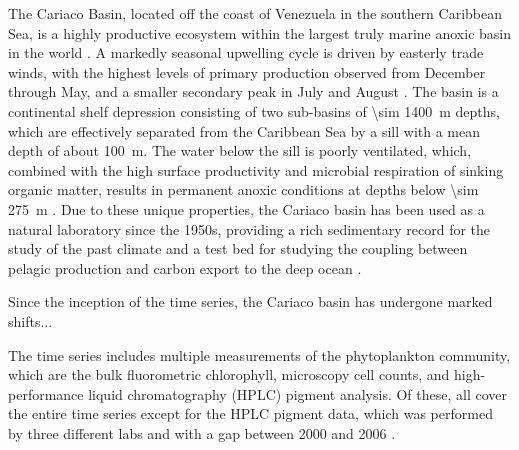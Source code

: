 \documentclass[draft]{agujournal2019}
\begin{document}
    The Cariaco Basin, located off the coast of Venezuela in the southern Caribbean Sea, is a highly productive ecosystem within the largest truly marine anoxic basin in the world \cite{edgcomb_accessing_2011}. A markedly seasonal upwelling cycle is driven by easterly trade winds, with the highest levels of primary production observed from December through May, and a smaller secondary peak in July and August \cite{mullerkarger_annual_2001, astor_seasonal_2003}. The basin is a continental shelf depression consisting of two sub-basins of \qty{\sim 1400}{m} depths, which are effectively separated from the Caribbean Sea by a sill with a mean depth of about \qty{100}{m}. The water below the sill is poorly ventilated, which, combined with the high surface productivity and microbial respiration of sinking organic matter, results in permanent anoxic conditions at depths below \qty{\sim 275}{m} \cite{thunell_organic_2000}. Due to these unique properties, the Cariaco basin has been used as a natural laboratory since the 1950s, providing a rich sedimentary record for the study of the past climate \cite{hughen1996nature} and a test bed for studying the coupling between pelagic production and carbon export to the deep ocean \cite{montes_vertical_2012}.




















    
    
    Since the inception of the time series, the Cariaco basin has undergone marked shifts...

    The time series includes multiple measurements of the phytoplankton community, which are the bulk fluorometric chlorophyll, microscopy cell counts, and high-performance liquid chromatography (HPLC) pigment analysis. Of these, all cover the entire time series except for the HPLC pigment data, which was performed by three different labs and with a gap between 2000 and 2006 \cite{muller-karger_scientific_2019}. 
\end{document}
